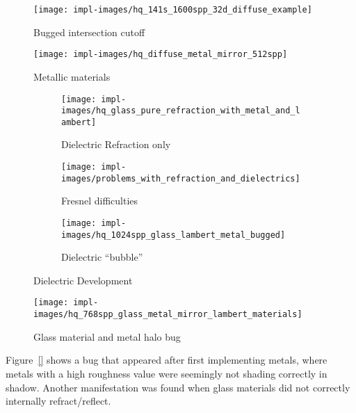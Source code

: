 \vspace{0.3em}
\begin{figure}[htb]
  \centering
  \texttt{[image: impl-images/hq\_141s\_1600spp\_32d\_diffuse\_example]}
  \caption{Bugged intersection cutoff}
  \label{fig:rayterm-cpu_intersection_bug}
\end{figure}

\vspace{0.3em}
\begin{figure}[htb]
  \centering
  \texttt{[image: impl-images/hq\_diffuse\_metal\_mirror\_512spp]}
  \caption{Metallic materials}
  \label{fig:rayterm-cpu_metallic}
\end{figure}

\vspace{0.3em}
\begin{figure}[htb]
  \centering
  \begin{subfigure}[htb]{0.3\textwidth}
    \texttt{[image: impl-images/hq\_glass\_pure\_refraction\_with\_metal\_and\_lambert]}
    \caption{Dielectric Refraction only}
    \label{fig:rayterm-cpu_dielectric_pure_refraction}
  \end{subfigure}
  \begin{subfigure}[htb]{0.3\textwidth}
    \texttt{[image: impl-images/problems\_with\_refraction\_and\_dielectrics]}
    \caption{Fresnel difficulties}
    \label{fig:rayterm-cpu_dielectric_frensel_difficulties}
  \end{subfigure}
  \begin{subfigure}[htb]{0.3\textwidth}
    \texttt{[image: impl-images/hq\_1024spp\_glass\_lambert\_metal\_bugged]}
    \caption{Dielectric ``bubble''}
    \label{fig:rayterm-cpu_dielectric_metallic_bug}
  \end{subfigure}
  \caption{Dielectric Development}
  \label{fig:rayterm-cpu_dielectric_development}
\end{figure}

\vspace{0.3em}
\begin{figure}[htb]
  \centering
  \texttt{[image: impl-images/hq\_768spp\_glass\_metal\_mirror\_lambert\_materials]}
  \caption{Glass material and metal halo bug}
  \label{fig:rayterm-cpu_glass_metal_bug}
\end{figure}

Figure~\ref{} shows a bug that appeared after first implementing metals, where metals with a high roughness value were seemingly not shading correctly in shadow.
Another manifestation was found when glass materials did not correctly internally refract/reflect.

